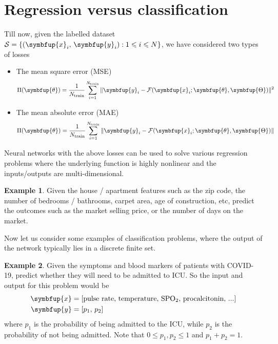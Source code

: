 \documentclass[11pt]{extarticle}
\newcommand{\vx}{\symbfup{x}}
\newcommand{\vy}{\symbfup{y}}
\theoremstyle{definition}
\newcommand{\btheta}{\symbfup{\theta}}
\newcommand{\Hp}{\symbfup{\Theta}}
\newtheorem{example}{Example}%
\begin{document}
\section*{Regression versus classification}
Till now, given the labelled dataset $\mathcal{S} = \{(\vx_i,\,\vy_i): 1 \leqslant i \leqslant N\}$, we have considered two types of losses
\begin{itemize}
  \item The mean square error (MSE)
  \begin{align*}
    \Pi(\btheta) =  \frac{1}{N_\text{train}} \sum_{i=1}^{N_\text{train}}\|\vy_i - \mathcal{F}(\vx_i; \btheta, \Hp)\|^2
  \end{align*}
  \item The mean absolute error (MAE)
  \begin{align*}
  \Pi(\btheta) =  \frac{1}{N_\text{train}} \sum_{i=1}^{N_\text{train}}\|\vy_i - \mathcal{F}(\vx_i; \btheta, \Hp)\|
  \end{align*}
\end{itemize}

Neural networks with the above losses can be used to solve various regression problems where the underlying function is highly nonlinear and the inputs/outputs are multi-dimensional.
\begin{example}
  Given the house / apartment features such as the zip code, the number of bedrooms / bathrooms, carpet area, age of construction, etc, predict the outcomes such as the market selling price, or the number of days on the market.
\end{example}

Now let us consider some examples of classification problems, where the output of the network typically lies in a discrete finite set.
\begin{example}
  Given the symptoms and blood markers of patients with COVID-19, predict whether they will need to be admitted to ICU. So the input and output for this problem would be
  \begin{equation*}
    \begin{aligned}
    \vx &= [\text{pulse rate},\,\text{temperature},\,\text{SPO}_2,\,\text{procalcitonin},\,... ]\\
    \vy &= [p_1,\,p_2]
    \end{aligned}
  \end{equation*}
  where $p_1$ is the probability of being admitted to the ICU, while $p_2$ is the probability of not being admitted. Note that $0 \leqslant p_1, p_2 \leq1$ and $p_1 + p_2 = 1$.
\end{example}
\end{document}
